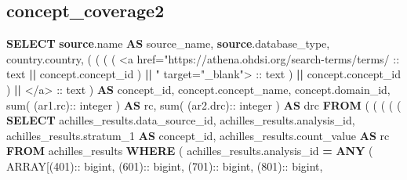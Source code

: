\documentclass[
]{book}
\newenvironment{Shaded}{\begin{snugshade}}{\end{snugshade}}
\newcommand{\DataTypeTok}[1]{\textcolor[rgb]{0.13,0.29,0.53}{#1}}
\newcommand{\DecValTok}[1]{\textcolor[rgb]{0.00,0.00,0.81}{#1}}
\newcommand{\FunctionTok}[1]{\textcolor[rgb]{0.00,0.00,0.00}{#1}}
\newcommand{\KeywordTok}[1]{\textcolor[rgb]{0.13,0.29,0.53}{\textbf{#1}}}
\newcommand{\NormalTok}[1]{#1}
\newcommand{\OperatorTok}[1]{\textcolor[rgb]{0.81,0.36,0.00}{\textbf{#1}}}
\newcommand{\StringTok}[1]{\textcolor[rgb]{0.31,0.60,0.02}{#1}}
\begin{document}
\hypertarget{concept_coverage2}{%
\subsection*{concept\_coverage2}\label{concept_coverage2}}

\begin{Shaded}
\begin{Highlighting}[]
\KeywordTok{SELECT}
  \KeywordTok{source}\NormalTok{.name }\KeywordTok{AS}\NormalTok{ source\_name,}
  \KeywordTok{source}\NormalTok{.database\_type,}
\NormalTok{  country.country,}
\NormalTok{  (}
\NormalTok{    (}
\NormalTok{      (}
\NormalTok{        (}
\StringTok{\textquotesingle{}\textless{}a href="https://athena.ohdsi.org/search{-}terms/terms/\textquotesingle{}}\NormalTok{ :: text}
          \OperatorTok{||}\NormalTok{ concept.concept\_id}
\NormalTok{        ) }\OperatorTok{||} \StringTok{\textquotesingle{}" target="\_blank"\textgreater{}\textquotesingle{}}\NormalTok{ :: text}
\NormalTok{      ) }\OperatorTok{||}\NormalTok{ concept.concept\_id}
\NormalTok{    ) }\OperatorTok{||} \StringTok{\textquotesingle{}\textless{}/a\textgreater{}\textquotesingle{}}\NormalTok{ :: text}
\NormalTok{  ) }\KeywordTok{AS}\NormalTok{ concept\_id,}
\NormalTok{  concept.concept\_name,}
\NormalTok{  concept.domain\_id,}
  \FunctionTok{sum}\NormalTok{(}
\NormalTok{    (ar1.rc):: }\DataTypeTok{integer}
\NormalTok{  ) }\KeywordTok{AS}\NormalTok{ rc,}
  \FunctionTok{sum}\NormalTok{(}
\NormalTok{    (ar2.drc):: }\DataTypeTok{integer}
\NormalTok{  ) }\KeywordTok{AS}\NormalTok{ drc}
\KeywordTok{FROM}
\NormalTok{  (}
\NormalTok{    (}
\NormalTok{      (}
\NormalTok{        (}
\NormalTok{          (}
            \KeywordTok{SELECT}
\NormalTok{              achilles\_results.data\_source\_id,}
\NormalTok{              achilles\_results.analysis\_id,}
\NormalTok{              achilles\_results.stratum\_1 }\KeywordTok{AS}\NormalTok{ concept\_id,}
\NormalTok{              achilles\_results.count\_value }\KeywordTok{AS}\NormalTok{ rc}
            \KeywordTok{FROM}
\NormalTok{              achilles\_results}
            \KeywordTok{WHERE}
\NormalTok{              (}
\NormalTok{                achilles\_results.analysis\_id }\OperatorTok{=} \KeywordTok{ANY}\NormalTok{ (}
                  \DataTypeTok{ARRAY}\NormalTok{[(}\DecValTok{401}\NormalTok{):: bigint,}
\NormalTok{                  (}\DecValTok{601}\NormalTok{):: bigint,}
\NormalTok{                  (}\DecValTok{701}\NormalTok{):: bigint,}
\NormalTok{                  (}\DecValTok{801}\NormalTok{):: bigint,}

\end{Highlighting}
\end{Shaded}
\end{document}
